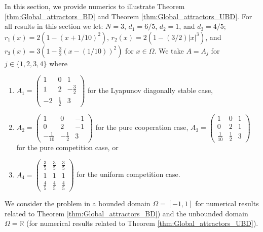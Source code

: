 \documentclass{article}
\begin{document}
In this section, we provide numerics to illustrate Theorem \ref{thm:Global_attractors_BD} and Theorem \ref{thm:Global_attractors_UBD}. For all results in this section we let: $N=3$, $d_1=6/5$, $d_2=1$, and $d_3=4/5$; $r_1(x)=2\left(1-\left(x+1/10\right)^2\right)$, $r_2(x)=2\left(1-(3/2)|x|^3\right)$, and $r_3(x)=3\left(1-\frac{3}{2}\left(x-(1/10)\right)^2\right)$ for $x\in\Omega$.  We take $A=A_j$ for $j\in\{1,2,3,4\}$ where
\begin{enumerate}
    \item[(a)] $A_1=\begin{pmatrix}
        1 & 0 & 1\\
        1 &2&-\frac{3}{2}\\
        -2 & \frac{1}{2}&3
    \end{pmatrix}$ for the Lyapunov diagonally stable case,
    \item[(b)] $A_2=\begin{pmatrix}
        1 & 0 & -1\\
        0 &2&-1\\
        -\frac{1}{10} & -\frac{1}{2}&3
    \end{pmatrix}$ for the pure cooperation case, $A_3=\begin{pmatrix}
        1 & 0 & 1\\
        0 &2&1\\
        \frac{1}{10} & \frac{1}{2}&3
    \end{pmatrix}$
    for the pure competition case, or
    \item[(c)] $A_4=\begin{pmatrix}
        \frac{3}{5} & \frac{3}{5} & \frac{3}{5}\\
        1 &1&1\\
        \frac{4}{5} & \frac{4}{5} & \frac{4}{5}
    \end{pmatrix}$ for the uniform competition case.
\end{enumerate}
We consider the problem in a bounded domain $\Omega=[-1,1]$ for numerical results related to Theorem \ref{thm:Global_attractors_BD}) and the unbounded domain $\Omega=\mathbb{R}$ (for numerical results related to Theorem \ref{thm:Global_attractors_UBD}).
\end{document}
